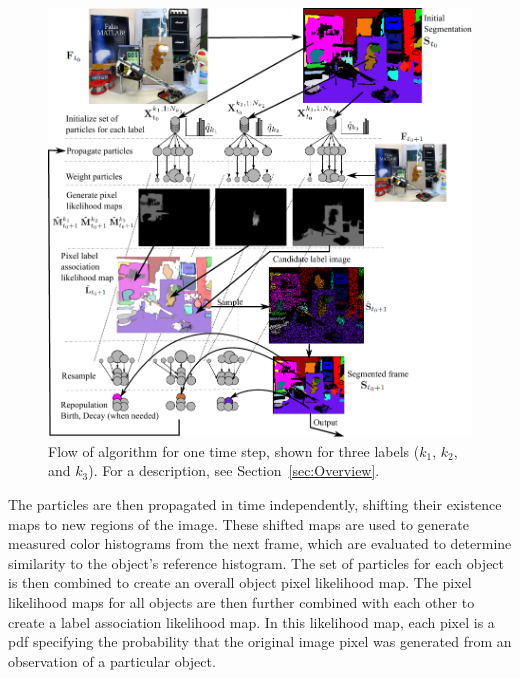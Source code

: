 \begin{figure}[!t]
\includegraphics[width=\linewidth]{figures/ECCV2012/AlgorithmFlow2.pdf}
  \caption[Overview of Algorithm]{Flow of algorithm for one time step, shown for three labels ($k_1$, $k_2$, and $k_3$). For a description, see Section~\ref{sec:Overview}.}
\label{fig:AlgorithmFlow}
\end{figure}

The particles are then propagated in time independently, shifting their existence maps to new regions of the image. These shifted maps are used to generate measured color histograms from the next frame, which are evaluated to determine similarity to the object's reference histogram. The set of particles for each object is then combined to create an overall object pixel likelihood map. The pixel likelihood maps for all objects are then further combined with each other to create a label association likelihood map. In this likelihood map, each pixel is a \gls{pdf} specifying the probability that the original image pixel was generated from an observation of a particular object.

